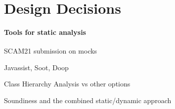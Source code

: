 \section{Design Decisions}
\label{sec:design-decisions}

\paragraph{Tools for static analysis}

SCAM21 submission on mocks

Javassist, Soot, Doop

Class Hierarchy Analysis vs other options

Soundiness and the combined static/dynamic approach
